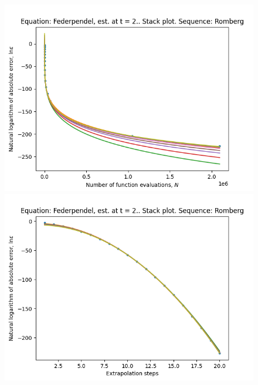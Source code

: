 \begin{figure}[H]
\centering
\begin{minipage}{0.45\textwidth}
\centering
\includegraphics[scale=0.45]{../results/emr_plots/federpendel_2_hp_romberg_stack.png}
\end{minipage}
\begin{minipage}{0.45\textwidth}
\centering
\includegraphics[scale=0.45]{../results/emr_plots/federpendel_2_hp_romberg_steps_stack.png}
\end{minipage}
\end{figure}

